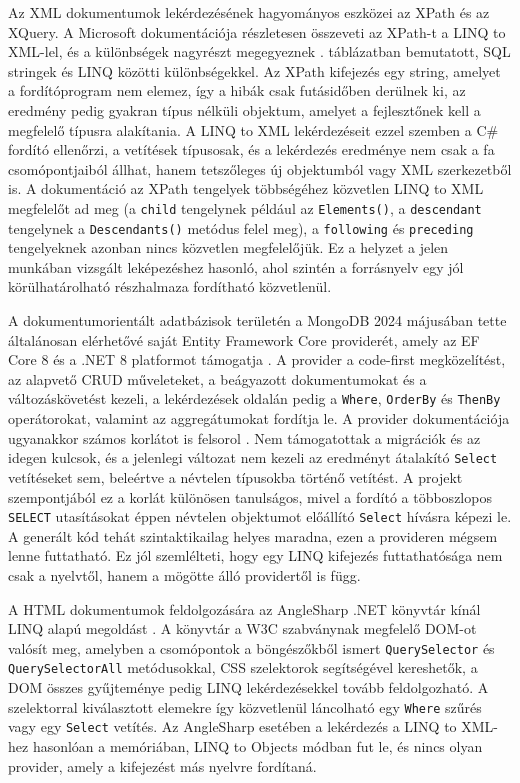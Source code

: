 Az XML dokumentumok lekérdezésének hagyományos eszközei az XPath és az XQuery. A Microsoft dokumentációja \cite{mslearn2024xpathlinq} részletesen összeveti az XPath-t a LINQ to XML-lel, és a különbségek nagyrészt megegyeznek . táblázatban bemutatott, SQL stringek és LINQ közötti különbségekkel. Az XPath kifejezés egy string, amelyet a fordítóprogram nem elemez, így a hibák csak futásidőben derülnek ki, az eredmény pedig gyakran típus nélküli objektum, amelyet a fejlesztőnek kell a megfelelő típusra alakítania. A LINQ to XML lekérdezéseit ezzel szemben a C\# fordító ellenőrzi, a vetítések típusosak, és a lekérdezés eredménye nem csak a fa csomópontjaiból állhat, hanem tetszőleges új objektumból vagy XML szerkezetből is. A dokumentáció az XPath tengelyek többségéhez közvetlen LINQ to XML megfelelőt ad meg (a \texttt{child} tengelynek például az \texttt{Elements()}, a \texttt{descendant} tengelynek a \texttt{Descendants()} metódus felel meg), a \texttt{following} és \texttt{preceding} tengelyeknek azonban nincs közvetlen megfelelőjük. Ez a helyzet a jelen munkában vizsgált leképezéshez hasonló, ahol szintén a forrásnyelv egy jól körülhatárolható részhalmaza fordítható közvetlenül.

A dokumentumorientált adatbázisok területén a MongoDB 2024 májusában tette általánosan elérhetővé saját Entity Framework Core providerét, amely az EF Core 8 és a .NET 8 platformot támogatja \cite{mongodb2024efcore}. A provider a code-first megközelítést, az alapvető CRUD műveleteket, a beágyazott dokumentumokat és a változáskövetést kezeli, a lekérdezések oldalán pedig a \texttt{Where}, \texttt{OrderBy} és \texttt{ThenBy} operátorokat, valamint az aggregátumokat fordítja le. A provider dokumentációja ugyanakkor számos korlátot is felsorol \cite{mongodb2024limitations}. Nem támogatottak a migrációk és az idegen kulcsok, és a jelenlegi változat nem kezeli az eredményt átalakító \texttt{Select} vetítéseket sem, beleértve a névtelen típusokba történő vetítést. A projekt szempontjából ez a korlát különösen tanulságos, mivel a fordító a többoszlopos \texttt{SELECT} utasításokat éppen névtelen objektumot előállító \texttt{Select} hívásra képezi le. A generált kód tehát szintaktikailag helyes maradna, ezen a provideren mégsem lenne futtatható. Ez jól szemlélteti, hogy egy LINQ kifejezés futtathatósága nem csak a nyelvtől, hanem a mögötte álló providertől is függ.

A HTML dokumentumok feldolgozására az AngleSharp .NET könyvtár kínál LINQ alapú megoldást \cite{anglesharp}. A könyvtár a W3C szabványnak megfelelő DOM-ot valósít meg, amelyben a csomópontok a böngészőkből ismert \texttt{QuerySelector} és \texttt{QuerySelectorAll} metódusokkal, CSS szelektorok segítségével kereshetők, a DOM összes gyűjteménye pedig LINQ lekérdezésekkel tovább feldolgozható. A szelektorral kiválasztott elemekre így közvetlenül láncolható egy \texttt{Where} szűrés vagy egy \texttt{Select} vetítés. Az AngleSharp esetében a lekérdezés a LINQ to XML-hez hasonlóan a memóriában, LINQ to Objects módban fut le, és nincs olyan provider, amely a kifejezést más nyelvre fordítaná.


